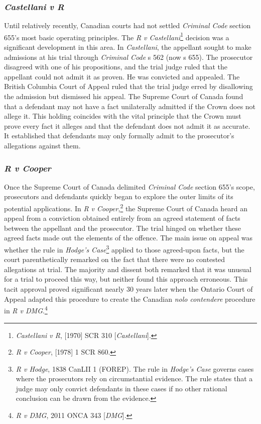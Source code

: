 \subsubsection{\textit{Castellani v R}}

Until relatively recently, Canadian courts had not settled \textit{Criminal Code} section 655's most basic operating principles. The \textit{R v Castellani}\footnote{\textit{Castellani v R}, [1970] SCR 310 [\textit{Castellani}].} decision was a significant development in this area. In \textit{Castellani}, the appellant sought to make admissions at his trial through \textit{Criminal Code} s 562 (now s 655). The prosecutor disagreed with one of his propositions, and the trial judge ruled that the appellant could not admit it as proven. He was convicted and appealed. The British Columbia Court of Appeal ruled that the trial judge erred by disallowing the admission but dismissed his appeal. The Supreme Court of Canada found that a defendant may not have a fact unilaterally admitted if the Crown does not allege it. This holding coincides with the vital principle that the Crown must prove every fact it alleges and that the defendant does not admit it as accurate. It established that defendants may only formally admit to the prosecutor's allegations against them. 

\subsubsection{\textit{R v Cooper}}

Once the Supreme Court of Canada delimited \textit{Criminal Code} section 655's scope, prosecutors and defendants quickly began to explore the outer limits of its potential applications. In \textit{R v Cooper},\footnote{\textit{R v Cooper}, [1978] 1 SCR 860.} the Supreme Court of Canada heard an appeal from a conviction obtained entirely from an agreed statement of facts between the appellant and the prosecutor. The trial hinged on whether these agreed facts made out the elements of the offence. The main issue on appeal was whether the rule in \textit{Hodge's Case}\footnote{\textit{R v Hodge}, 1838 CanLII 1 (FOREP). The rule in \textit{Hodge's Case} governs cases where the prosecutors rely on circumstantial evidence. The rule states that a judge may only convict defendants in these cases if no other rational conclusion can be drawn from the evidence.} applied to those agreed-upon facts, but the court parenthetically remarked on the fact that there were no contested allegations at trial. The majority and dissent both remarked that it was unusual for a trial to proceed this way, but neither found this approach erroneous. This tacit approval proved significant nearly 30 years later when the Ontario Court of Appeal adapted this procedure to create the Canadian \textit{nolo contendere} procedure in \textit{R v DMG}.\footnote{\textit{R v DMG}, 2011 ONCA 343 [\textit{DMG}].}

